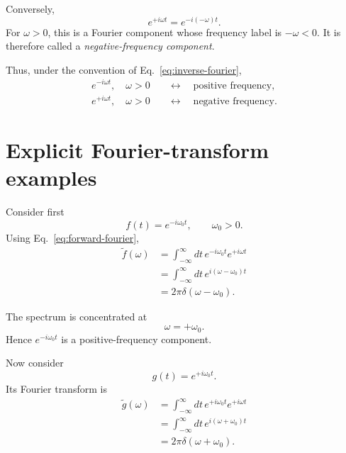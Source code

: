 \documentclass[11pt]{article}
\begin{document}
Conversely,
\begin{equation}
e^{+i\omega t}
=
e^{-i(-\omega)t}.
\label{eq:rewrite-positive-exp}
\end{equation}
For $\omega>0$, this is a Fourier component whose frequency label is $-\omega<0$. It is therefore called a \emph{negative-frequency component}.

Thus, under the convention of Eq.~\eqref{eq:inverse-fourier},
\begin{equation}
\boxed{
\begin{aligned}
e^{-i\omega t},\quad \omega>0
&\quad\longleftrightarrow\quad
\text{positive frequency},\\[4pt]
e^{+i\omega t},\quad \omega>0
&\quad\longleftrightarrow\quad
\text{negative frequency}.
\end{aligned}}
\label{eq:frequency-identification}
\end{equation}

\section{Explicit Fourier-transform examples}

Consider first
\begin{equation}
f(t)=e^{-i\omega_0 t},
\qquad
\omega_0>0.
\label{eq:positive-example}
\end{equation}
Using Eq.~\eqref{eq:forward-fourier},
\begin{align}
\widetilde f(\omega)
&=
\int_{-\infty}^{\infty}
dt\,
e^{-i\omega_0t}e^{+i\omega t}\\
&=
\int_{-\infty}^{\infty}
dt\,
e^{i(\omega-\omega_0)t}\\
&=
2\pi\delta(\omega-\omega_0).
\label{eq:positive-spectrum}
\end{align}

The spectrum is concentrated at
\begin{equation}
\omega=+\omega_0.
\end{equation}
Hence $e^{-i\omega_0t}$ is a positive-frequency component.

Now consider
\begin{equation}
g(t)=e^{+i\omega_0t}.
\label{eq:negative-example}
\end{equation}
Its Fourier transform is
\begin{align}
\widetilde g(\omega)
&=
\int_{-\infty}^{\infty}
dt\,
e^{+i\omega_0t}e^{+i\omega t}\\
&=
\int_{-\infty}^{\infty}
dt\,
e^{i(\omega+\omega_0)t}\\
&=
2\pi\delta(\omega+\omega_0).
\label{eq:negative-spectrum}
\end{align}
\end{document}
